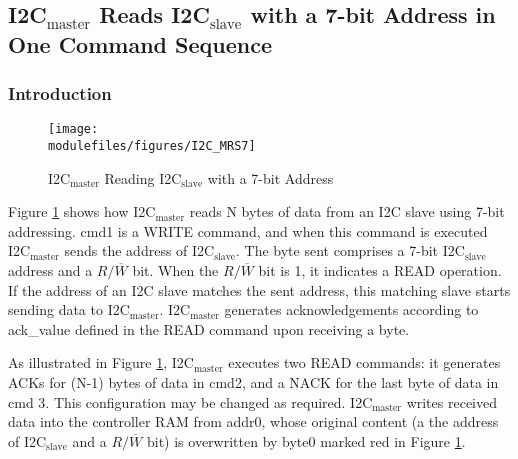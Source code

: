 \documentclass[main\_\_EN.tex]{subfiles}
\begin{document}
\subsection{\texorpdfstring{I2C$_\text{master}$ Reads I2C$_\text{slave}$ with a 7-bit Address in One Command Sequence}{I2C master Reads I2C slave with a 7-bit Address in One Command Sequence}}
\subsubsection{Introduction}
\begin{figure}[H]
    \centering
    \texttt{[image: \\modulefiles/figures/I2C\_MRS7]}
    \caption{I2C$_\text{master}$ Reading I2C$_\text{slave}$ with a 7-bit Address}
    \label{fig:i2c-mrs7}
\end{figure}

Figure \ref{fig:i2c-mrs7} shows how I2C$_\text{master}$ reads N bytes of data from an I2C slave using 7-bit addressing. cmd1 is a WRITE command, and when this command is executed I2C$_\text{master}$ sends the address of I2C$_\text{slave}$. The byte sent comprises a 7-bit I2C$_\text{slave}$ address and a $R/\overline W$ bit. When the $R/\overline W$ bit is 1, it indicates a READ operation. If the address of an I2C slave matches the sent address, this matching slave starts sending data to I2C$_\text{master}$. I2C$_\text{master}$ generates acknowledgements according to ack\_value defined in the READ command upon receiving a byte.

As illustrated in Figure \ref{fig:i2c-mrs7}, I2C$_\text{master}$ executes two READ commands: it generates ACKs for (N-1) bytes of data in cmd2, and a NACK for the last byte of data in cmd 3. This configuration may be changed as required. I2C$_\text{master}$ writes received data into the controller RAM from addr0, whose original content (a the address of I2C$_\text{slave}$ and a $R/\overline W$ bit) is overwritten by byte0 marked red in Figure \ref{fig:i2c-mrs7}.
\end{document}
